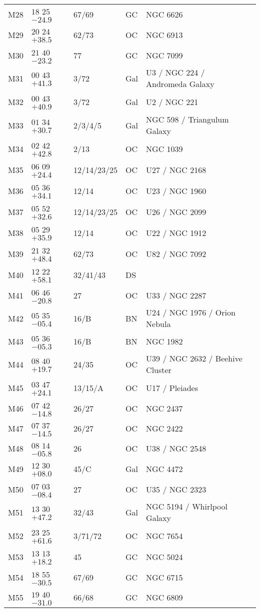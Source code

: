 \begin{table}[p]
\begin{tabular}{llllll}
M28&$18$ $25$ $-24.9$&67/69&GC&NGC 6626\\
M29&$20$ $24$ $+38.5$&62/73&OC&NGC 6913\\
M30&$21$ $40$ $-23.2$&77&GC&NGC 7099\\
M31&$00$ $43$ $+41.3$&3/72&Gal&U3 / NGC 224 / Andromeda Galaxy\\
M32&$00$ $43$ $+40.9$&3/72&Gal&U2 / NGC 221\\
M33&$01$ $34$ $+30.7$&2/3/4/5&Gal&NGC 598 / Triangulum Galaxy\\
M34&$02$ $42$ $+42.8$&2/13&OC&NGC 1039\\
M35&$06$ $09$ $+24.4$&12/14/23/25&OC&U27 / NGC 2168\\
M36&$05$ $36$ $+34.1$&12/14&OC&U23 / NGC 1960\\
M37&$05$ $52$ $+32.6$&12/14/23/25&OC&U26 / NGC 2099\\
M38&$05$ $29$ $+35.9$&12/14&OC&U22 / NGC 1912\\
M39&$21$ $32$ $+48.4$&62/73&OC&U82 / NGC 7092\\
M40&$12$ $22$ $+58.1$&32/41/43&DS&\\
M41&$06$ $46$ $-20.8$&27&OC&U33 / NGC 2287\\
M42&$05$ $35$ $-05.4$&16/B&BN&U24 / NGC 1976 / Orion Nebula\\
M43&$05$ $36$ $-05.3$&16/B&BN&NGC 1982\\
M44&$08$ $40$ $+19.7$&24/35&OC&U39 / NGC 2632 / Beehive Cluster\\
M45&$03$ $47$ $+24.1$&13/15/A&OC&U17 / Pleiades\\
M46&$07$ $42$ $-14.8$&26/27&OC&NGC 2437\\
M47&$07$ $37$ $-14.5$&26/27&OC&NGC 2422\\
M48&$08$ $14$ $-05.8$&26&OC&U38 / NGC 2548\\
M49&$12$ $30$ $+08.0$&45/C&Gal&NGC 4472\\
M50&$07$ $03$ $-08.4$&27&OC&U35 / NGC 2323\\
M51&$13$ $30$ $+47.2$&32/43&Gal&NGC 5194 / Whirlpool Galaxy\\
M52&$23$ $25$ $+61.6$&3/71/72&OC&NGC 7654\\
M53&$13$ $13$ $+18.2$&45&GC&NGC 5024\\
M54&$18$ $55$ $-30.5$&67/69&GC&NGC 6715\\
M55&$19$ $40$ $-31.0$&66/68&GC&NGC 6809\\
\hline
\end{tabular}
\end{table}

